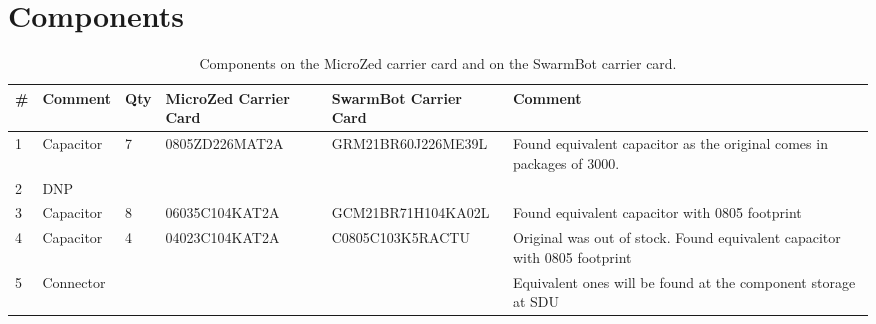\section{Components}
\label{app:components}
\begin{sidewaystable}

\centering
\caption{Components on the MicroZed carrier card and on the SwarmBot carrier card.}
\label{tab:components1}
\begin{tabular}{|p{0.3cm}|p{2cm}|p{0.5cm}|l|l|p{5cm}|}
\hline
\textbf{\#}      & \textbf{Comment}       & \textbf{Qty} & \textbf{MicroZed Carrier Card} & \textbf{SwarmBot Carrier Card} & \textbf{Comment}                                                                                                                                                                                                      \\ \hline
1       & Capacitor              & 7        & 0805ZD226MAT2A        & GRM21BR60J226ME39L    & Found equivalent capacitor as the original comes in packages of 3000.                                                                                                                                        \\ \hline
2       & DNP                    &          &                       &                       &                                                                                                                                                                                                              \\ \hline
3       & Capacitor              & 8        & 06035C104KAT2A        & GCM21BR71H104KA02L    & Found equivalent capacitor with 0805 footprint                                                                                                                                                               \\ \hline
4       & Capacitor              & 4        & 04023C104KAT2A        & C0805C103K5RACTU      & Original was out of stock. Found equivalent capacitor with 0805 footprint                                                                                                                                    \\ \hline
5       & Connector              &          &                       &                       & Equivalent ones will be found at the component storage at SDU                                                                                                                                                \\ \hline

\end{tabular}
\end{sidewaystable}
